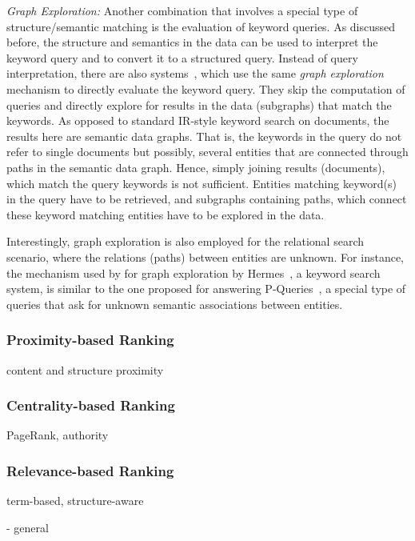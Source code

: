 	\emph{Graph Exploration:}  Another combination that involves a special type of structure/semantic matching is the evaluation of keyword queries. As discussed before, the structure and semantics in the data can be used to interpret the keyword query and to convert it to a structured query. Instead of query interpretation, there are also systems~\cite{DBLP:conf/cikm/LadwigT11,DBLP:conf/sigmod/LiOFWZ08}, which use the same \emph{graph exploration} mechanism to directly evaluate the keyword query. They skip the computation of queries and directly explore for results in the data (subgraphs) that match the keywords. As opposed to standard IR-style keyword search on documents, the results here are semantic data graphs. That is, the keywords in the query do not refer to single documents but possibly, several entities that are connected through paths in the semantic data graph. Hence, simply joining results (documents), which match the query keywords is not sufficient. Entities matching keyword(s) in the query have to be retrieved, and subgraphs containing paths, which connect these keyword matching entities have to be explored in the data. 

Interestingly, graph exploration is also employed for the relational search scenario, where the relations (paths) between entities are unknown. For instance, the mechanism used by for graph exploration by Hermes~\cite{DBLP:journals/ws/TranWH09,DBLP:conf/icde/TranWRC09}, a keyword search system, is similar to the one proposed for answering P-Queries~\cite{DBLP:conf/www/AnyanwuS03}, a special type of queries that ask for unknown semantic associations between entities. 
	
	
	 

	\subsubsection{Proximity-based Ranking} content and structure proximity
	\subsubsection{Centrality-based Ranking} PageRank, authority
	\subsubsection{Relevance-based Ranking} term-based, structure-aware	 


- general \cite{DBLP:conf/www/GuhaMM03,DBLP:conf/www/AnyanwuMS05,DBLP:conf/cikm/DingFJPCPRDS04,DBLP:journals/ws/TranWH09,DBLP:journals/ws/TranHL11,DBLP:journals/ws/WangTLF11,DBLP:journals/ws/HalpinL11,DBLP:journals/ws/FazzingaGGL11,DBLP:journals/ws/FernandezCLVCM11}\\

